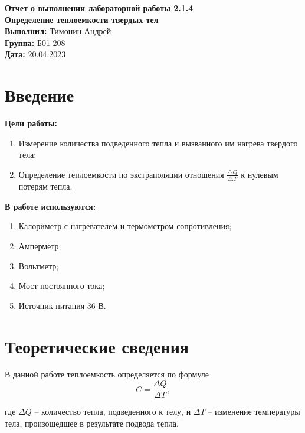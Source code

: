 \documentclass[a4paper, 12pt]{article}
\begin{document}
	\begin{Huge}
		\begin{center}
			\textbf{Отчет о выполнении лабораторной работы 2.1.4}\\
			\vspace{2em}
			\textbf{Определение теплоемкости твердых тел}\\
			\vspace{5em}
			\textbf{Выполнил: }Тимонин Андрей\\
			\textbf{Группа: }Б01-208\\
			\vspace{9em}
			\textbf{Дата: }20.04.2023\\
		\end{center}
	\end{Huge}
	
	\section{Введение}
	\noindent\textbf{Цели работы:}
	\begin{enumerate}
		\item Измерение количества подведенного тепла и вызванного им нагрева твердого тела;
		\item Определение теплоемкости по экстраполяции отношения $\frac{\bigtriangleup Q}{\bigtriangleup T}$ к нулевым потерям тепла.
	\end{enumerate}
	\bigskip
	
	\noindent\textbf{В работе используются:}
	\begin{enumerate}
		\item Калориметр с нагревателем и термометром сопротивления;
		\item Амперметр;
		\item Вольтметр;
		\item Мост постоянного тока;
		\item Источник питания 36 В.
	\end{enumerate}
	
	\section{Теоретические сведения}
В данной работе теплоемкость определяется по формуле
\begin{equation}
	C = \frac{\Delta Q}{\Delta T},
	\label{eq:dQdT}
\end{equation}

где $\Delta Q$ -- количество тепла, подведенного к телу, и $\Delta T$ -- изменение температуры тела, произошедшее в результате подвода тепла.
\end{document}
